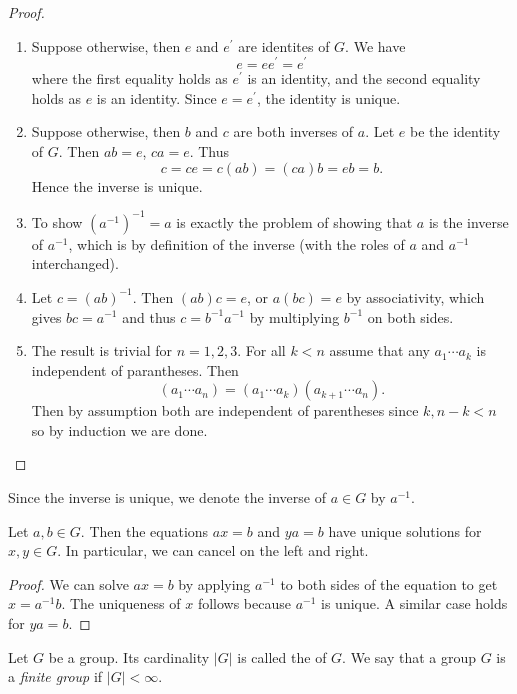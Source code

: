 \begin{proof} \
\begin{enumerate}[label=(\roman*)]
\item Suppose otherwise, then $e$ and $e^\prime$ are identites of $G$. We have
\[e=ee^\prime=e^\prime\]
where the first equality holds as $e^\prime$ is an identity, and the second equality holds as $e$ is an identity. Since $e=e^\prime$, the identity is unique.
\item Suppose otherwise, then $b$ and $c$ are both inverses of $a$. Let $e$ be the identity of $G$. Then $ab=e$, $ca=e$. Thus
\[c=ce=c(ab)=(ca)b=eb=b.\]
Hence the inverse is unique.
\item To show $(a^{-1})^{-1}=a$ is exactly the problem of showing that $a$ is the inverse of $a^{-1}$, which is by definition of the inverse (with the roles of $a$ and $a^{-1}$ interchanged).
\item Let $c=(ab)^{-1}$. Then $(ab)c=e$, or $a(bc)=e$ by associativity, which gives $bc=a^{-1}$ and thus $c=b^{-1}a^{-1}$ by multiplying $b^{-1}$ on both sides.
\item The result is trivial for $n=1,2,3$. For all $k<n$ assume that any $a_1\cdots a_k$ is independent of parantheses. Then
\[(a_1\cdots a_n)=(a_1\cdots a_k)(a_{k+1}\cdots a_n).\]
Then by assumption both are independent of parentheses since $k,n-k<n$ so by induction we are done.
\end{enumerate}
\end{proof}

\begin{notation}
Since the inverse is unique, we denote the inverse of $a\in G$ by $a^{-1}$.
\end{notation}

\begin{proposition}
Let $a,b\in G$. Then the equations $ax=b$ and $ya=b$ have unique solutions for $x,y\in G$. In particular, we can cancel on the left and right.
\end{proposition}

\begin{proof}
We can solve $ax=b$ by applying $a^{-1}$ to both sides of the equation to get $x=a^{-1}b$. The uniqueness of $x$ follows because $a^{-1}$ is unique. A similar case holds for $ya=b$.
\end{proof}

\begin{definition}
Let $G$ be a group. Its cardinality $|G|$ is called the  of $G$. We say that a group $G$ is a \emph{finite group} if $|G|<\infty$.
\end{definition}

